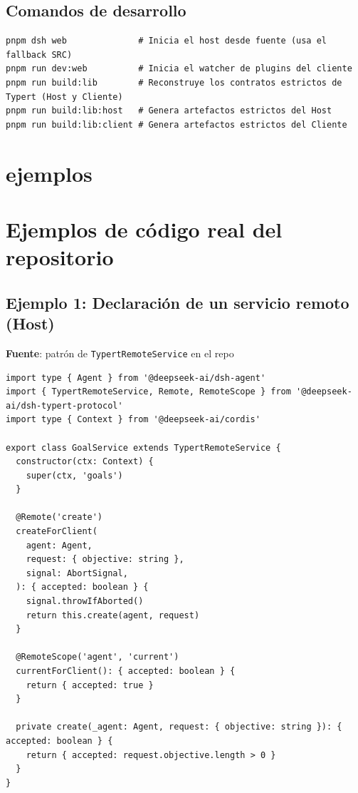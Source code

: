 \documentclass[11pt,a4paper]{article}
\begin{document}
\subsection*{Comandos de desarrollo}


\begin{lstlisting}
pnpm dsh web              # Inicia el host desde fuente (usa el fallback SRC)
pnpm run dev:web          # Inicia el watcher de plugins del cliente
pnpm run build:lib        # Reconstruye los contratos estrictos de Typert (Host y Cliente)
pnpm run build:lib:host   # Genera artefactos estrictos del Host
pnpm run build:lib:client # Genera artefactos estrictos del Cliente
\end{lstlisting}


\section*{ejemplos}

\section*{Ejemplos de código real del repositorio}


\subsection*{Ejemplo 1: Declaración de un servicio remoto (Host)}


\textbf{Fuente}: patrón de \texttt{TypertRemoteService} en el repo


\begin{lstlisting}
import type { Agent } from '@deepseek-ai/dsh-agent'
import { TypertRemoteService, Remote, RemoteScope } from '@deepseek-ai/dsh-typert-protocol'
import type { Context } from '@deepseek-ai/cordis'

export class GoalService extends TypertRemoteService {
  constructor(ctx: Context) {
    super(ctx, 'goals')
  }

  @Remote('create')
  createForClient(
    agent: Agent,
    request: { objective: string },
    signal: AbortSignal,
  ): { accepted: boolean } {
    signal.throwIfAborted()
    return this.create(agent, request)
  }

  @RemoteScope('agent', 'current')
  currentForClient(): { accepted: boolean } {
    return { accepted: true }
  }

  private create(_agent: Agent, request: { objective: string }): { accepted: boolean } {
    return { accepted: request.objective.length > 0 }
  }
}
\end{lstlisting}
\end{document}
